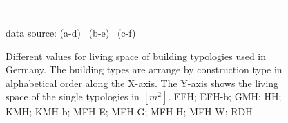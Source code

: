 \begin{figure}[htb]
\vspace{-1cm} 

\hspace{-2.5cm}
  \begin{tabular}{p{0.33\linewidth} p{0.33\linewidth} p{0.33\linewidth}}
&
&
\\

\vspace{-3cm} 
& \vspace{-3cm} 
& \vspace{-3cm}
\\
    \end{tabular}
    
\vspace{-1.6cm}
\begin{flushright}
\footnotesize{data source:
(a-d)~\cite{Blesl.2007}
(b-e)~\cite{Loga.2011}
(c-f)~\cite{Born.2003}
}
\end{flushright}
	\caption[Different values for living space of building typologies used in
	Germany.]{Different values for living space of building typologies used in
	Germany.
    The building types are arrange by construction type in alphabetical order
    along the X-axis.
	The Y-axis shows the living space of the single typologies in
	$[m^2]$.
	EFH; EFH-b; GMH; HH; KMH; KMH-b; MFH-E; MFH-G; MFH-H; MFH-W; RDH}
    \label{fig:DifTypArea}
\end{figure}
